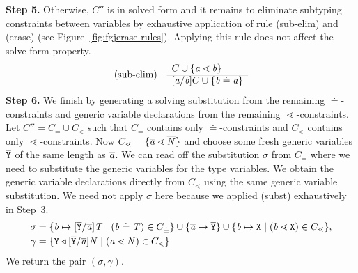 \textbf{Step 5.} Otherwise, $C''$ is in solved form and it remains to eliminate subtyping constraints between variables by exhaustive application of rule
(sub-elim) and (erase) (see Figure~\ref{fig:fgjerase-rules}). Applying this rule does not affect the solve form property.
\begin{gather*}
  \begin{array}[c]{lll}
    \text{(sub-elim)} &
                     \begin{array}[c]{l}
                       C \cup \{ \mathit{ a } \lessdot \mathit{ b } \}\\
                       \hline
                       [\mathit{ a }/\mathit{ b }]C \cup \{ \mathit{ b } \doteq \mathit{ a } \}
                     \end{array}
  \end{array}
\end{gather*}
\textbf{Step 6.} We finish by generating a solving substitution from the remaining $\doteq$-constraints
and generic variable declarations from the remaining $\lessdot$-constraints. Let $C'' = C_{\doteq} \cup C_{\lessdot}$ such that $C_{\doteq}$
contains only $\doteq$-constraints and $C_{\lessdot}$ contains only $\lessdot$-constraints. Now $C_{\lessdot} = \{  \overline{\mathit{\mathit{ a }}} \lessdot
  \overline{\mathit{N}} \}$ and choose some fresh generic variables $\overline{\tt Y}$ of the same length as $\overline{\mathit{\mathit{ a }}}$. We can read off the substitution $\sigma$
from $C_{\doteq}$ where we need to substitute the generic variables for the type variables. We obtain the generic variable declarations
directly from $C_{\lessdot}$ using the same generic variable substitution. We need not apply $\sigma$ here because
we applied (subst) exhaustively in Step~3.
\begin{align*}
  \sigma &=
           \{ \mathit{ b } \mapsto [\overline{\tt Y}/\overline{\tt \mathit{ a }}]\mathit{T} \mid
           (\mathit{ b } \doteq \mathit{T}) \in C_{\doteq} \}
           \cup 
           \{ \overline{\mathit{\mathit{ a }}} \mapsto \overline{\tt Y} \}
           \cup 
           \{ {\mathit{ b }} \mapsto {\tt X} \mid (\mathit{ b } \lessdot {\tt X}) \in C_{\lessdot} \}, \\
  \gamma{} & =
                     \{ \texttt{Y} \triangleleft [\overline{\tt Y}/\overline{\tt \mathit{ a }}]\mathit{N} \mid (\mathit{ a } \lessdot \mathit{N}) \in C_{\lessdot} \}
\end{align*}
We return the pair $(\sigma, \gamma)$.

